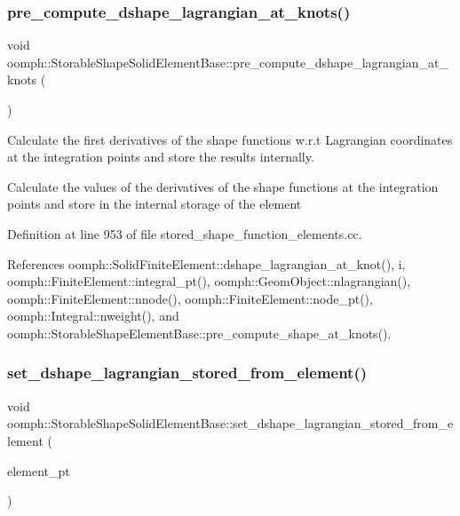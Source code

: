\subsubsection{\texorpdfstring{pre\+\_\+compute\+\_\+dshape\+\_\+lagrangian\+\_\+at\+\_\+knots()}{pre\_compute\_dshape\_lagrangian\_at\_knots()}}
{\footnotesize\ttfamily void oomph\+::\+Storable\+Shape\+Solid\+Element\+Base\+::pre\+\_\+compute\+\_\+dshape\+\_\+lagrangian\+\_\+at\+\_\+knots (\begin{DoxyParamCaption}{ }\end{DoxyParamCaption})}



Calculate the first derivatives of the shape functions w.\+r.\+t Lagrangian coordinates at the integration points and store the results internally. 

Calculate the values of the derivatives of the shape functions at the integration points and store in the internal storage of the element 

Definition at line 953 of file stored\+\_\+shape\+\_\+function\+\_\+elements.\+cc.



References oomph\+::\+Solid\+Finite\+Element\+::dshape\+\_\+lagrangian\+\_\+at\+\_\+knot(), i, oomph\+::\+Finite\+Element\+::integral\+\_\+pt(), oomph\+::\+Geom\+Object\+::nlagrangian(), oomph\+::\+Finite\+Element\+::nnode(), oomph\+::\+Finite\+Element\+::node\+\_\+pt(), oomph\+::\+Integral\+::nweight(), and oomph\+::\+Storable\+Shape\+Element\+Base\+::pre\+\_\+compute\+\_\+shape\+\_\+at\+\_\+knots().

\mbox{\label{classoomph_1_1StorableShapeSolidElementBase_af28a213163e0b5dfb7d9597783dfec3f}} 
\subsubsection{\texorpdfstring{set\+\_\+dshape\+\_\+lagrangian\+\_\+stored\+\_\+from\+\_\+element()}{set\_dshape\_lagrangian\_stored\_from\_element()}}
{\footnotesize\ttfamily void oomph\+::\+Storable\+Shape\+Solid\+Element\+Base\+::set\+\_\+dshape\+\_\+lagrangian\+\_\+stored\+\_\+from\+\_\+element (\begin{DoxyParamCaption}\item[{\hyperlink{classoomph_1_1StorableShapeSolidElementBase}{Storable\+Shape\+Solid\+Element\+Base} $\ast$const \&}]{element\+\_\+pt }\end{DoxyParamCaption})}



